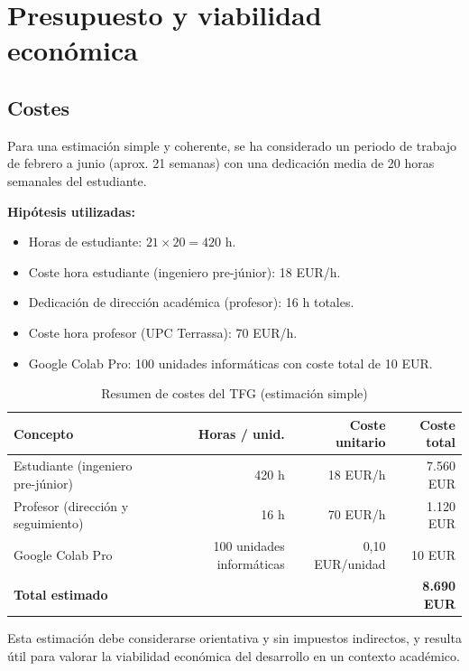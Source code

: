
\chapter{Presupuesto y viabilidad económica}

\section{Costes}

Para una estimación simple y coherente, se ha considerado un periodo de trabajo de febrero a junio (aprox. 21 semanas) con una dedicación media de 20 horas semanales del estudiante.

\textbf{Hipótesis utilizadas:}
\begin{itemize}
	\item Horas de estudiante: $21 \times 20 = 420$ h.
	\item Coste hora estudiante (ingeniero pre-júnior): 18 EUR/h.
	\item Dedicación de dirección académica (profesor): 16 h totales.
	\item Coste hora profesor (UPC Terrassa): 70 EUR/h.
	\item Google Colab Pro: 100 unidades informáticas con coste total de 10 EUR.
\end{itemize}

\begin{table}[htbp]
\centering
\caption{Resumen de costes del TFG (estimación simple)}
\begingroup
\small
\setlength{\tabcolsep}{4pt}
\begin{tabular}{p{5.2cm}rrr}
\toprule
\textbf{Concepto} & \textbf{Horas / unid.} & \textbf{Coste unitario} & \textbf{Coste total} \\
\midrule
Estudiante (ingeniero pre-júnior) & 420 h & 18 EUR/h & 7.560 EUR \\
Profesor (dirección y seguimiento) & 16 h & 70 EUR/h & 1.120 EUR \\
Google Colab Pro & 100 unidades informáticas & 0,10 EUR/unidad & 10 EUR \\
\midrule
\textbf{Total estimado} &  &  & \textbf{8.690 EUR} \\
\bottomrule
\end{tabular}
\endgroup
\end{table}

Esta estimación debe considerarse orientativa y sin impuestos indirectos, y resulta útil para valorar la viabilidad económica del desarrollo en un contexto académico.


